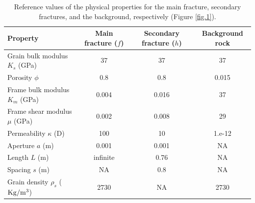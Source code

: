 \documentclass[draft]{agujournal2019}
\begin{document}
\begin{table}[!ht]
  \caption{Reference values of the physical properties for the main fracture, secondary fractures, and the background, respectively (Figure \ref{fig.1}). }
\begin{center}
  \begin{tabular}{ | l c  c  c | }
    \hline
    Property & Main fracture ($f$) & Secondary fracture ($h$) & Background rock \\ \hline
    Grain bulk modulus $K_s$ (GPa) & 37 & 37 & 37 \\ 
    Porosity $\phi$ & 0.8 & 0.8 & 0.015 \\ 
    Frame bulk modulus $K_m$ (GPa) &  0.004 & 0.016 & 37\\ 
    Frame shear modulus $\mu$ (GPa) & 0.002 & 0.008 & 29\\
    Permeability $\kappa$ (D) & 100 & 10 & 1.e-12\\
    Aperture $a$ (m) & 0.001 & 0.001 & NA\\
    Length $L$ (m) & infinite & 0.76 & NA \\
    Spacing $s$ (m) & NA & 0.8 & NA \\
    Grain density $\rho_s$ ($\rm{Kg/m^3}$) & 2730 & NA & 2730\\ 
    \hline
  \end{tabular}
  \label{table.1}
\end{center}
\end{table}
\end{document}
